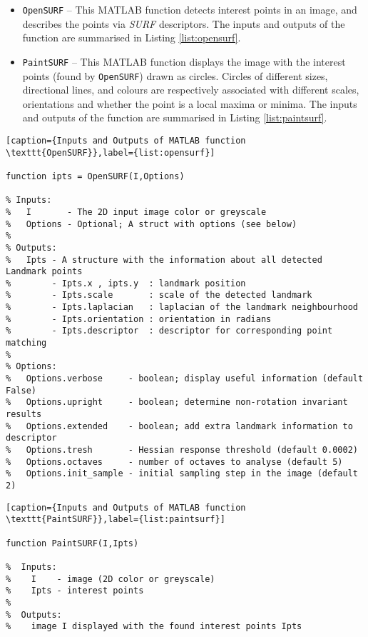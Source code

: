 \begin{itemize}
    \item \texttt{OpenSURF} -- This MATLAB function detects interest points in an image, and describes the points via \textit{SURF} descriptors. The inputs and outputs of the function are summarised in Listing \ref{list:opensurf}.
    \item \texttt{PaintSURF} -- This MATLAB function displays the image with the interest points (found by \texttt{OpenSURF}) drawn as circles. Circles of different sizes, directional lines, and colours are respectively associated with different scales, orientations and whether the point is a local maxima or minima. The inputs and outputs of the function are summarised in Listing \ref{list:paintsurf}.\\
\end{itemize}


\scriptsize
\begin{lstlisting} 
[caption={Inputs and Outputs of MATLAB function \texttt{OpenSURF}},label={list:opensurf}]

function ipts = OpenSURF(I,Options)

% Inputs:
%   I       - The 2D input image color or greyscale
%   Options - Optional; A struct with options (see below)
%
% Outputs:
%   Ipts - A structure with the information about all detected Landmark points
%        - Ipts.x , ipts.y  : landmark position
%        - Ipts.scale       : scale of the detected landmark
%        - Ipts.laplacian   : laplacian of the landmark neighbourhood
%        - Ipts.orientation : orientation in radians
%        - Ipts.descriptor  : descriptor for corresponding point matching
%
% Options:
%   Options.verbose     - boolean; display useful information (default False)
%   Options.upright     - boolean; determine non-rotation invariant results
%   Options.extended    - boolean; add extra landmark information to descriptor
%   Options.tresh       - Hessian response threshold (default 0.0002)
%   Options.octaves     - number of octaves to analyse (default 5)
%   Options.init_sample - initial sampling step in the image (default 2)
\end{lstlisting}
\normalsize


\scriptsize
\begin{lstlisting} 
[caption={Inputs and Outputs of MATLAB function \texttt{PaintSURF}},label={list:paintsurf}]

function PaintSURF(I,Ipts)

%  Inputs:
%    I    - image (2D color or greyscale)
%    Ipts - interest points
%
%  Outputs:
%    image I displayed with the found interest points Ipts
\end{lstlisting}
\normalsize

